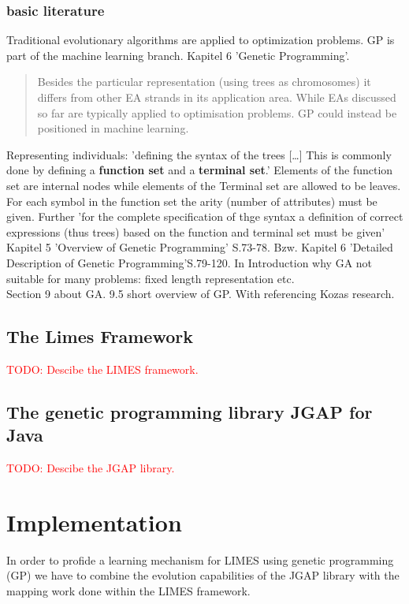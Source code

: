 \documentclass{article}%
\begin{document}
\subsubsection{basic literature}
Traditional evolutionary algorithms are applied to optimization problems. GP is part of the machine learning branch. Kapitel 6 'Genetic Programming'.\cite{EibenSmith2007}
\begin{quotation}
Besides the particular representation (using trees as chromosomes) it differs from other EA strands in its application area. While EAs discussed so far are typically applied to optimisation problems. GP could instead be positioned in machine learning.
\end{quotation}
Representing individuals: 'defining the syntax of the trees [\dots] This is commonly done by defining a \textbf{function set} and a \textbf{terminal set}.' Elements of the function set are internal nodes while elements of the Terminal set are allowed to be leaves. For each symbol in the function set the arity (number of attributes) must be given. Further 'for the complete specification of thge syntax a definition of correct expressions (thus trees) based on the function and terminal set must be given'\cite{EibenSmith2007}
\\
Kapitel 5 'Overview of Genetic Programming' S.73-78. Bzw. Kapitel 6 'Detailed Description of Genetic Programming'S.79-120.
In Introduction why GA not suitable for many problems: fixed length representation etc.\cite{Koza92geneticprogrammingbook}
\\
Section 9 about GA. 9.5 short overview of GP. With referencing Kozas research.
\subsection{The Limes Framework}

\textcolor{red}{
TODO: Descibe the LIMES framework. }
\subsection{The genetic programming library JGAP for Java}
\textcolor{red}{
TODO: Descibe the JGAP library.}
\section{Implementation}
In order to profide a learning mechanism for LIMES using genetic programming (GP) we have to combine the evolution capabilities of the JGAP library with the mapping work done within the LIMES framework. 
\end{document}
